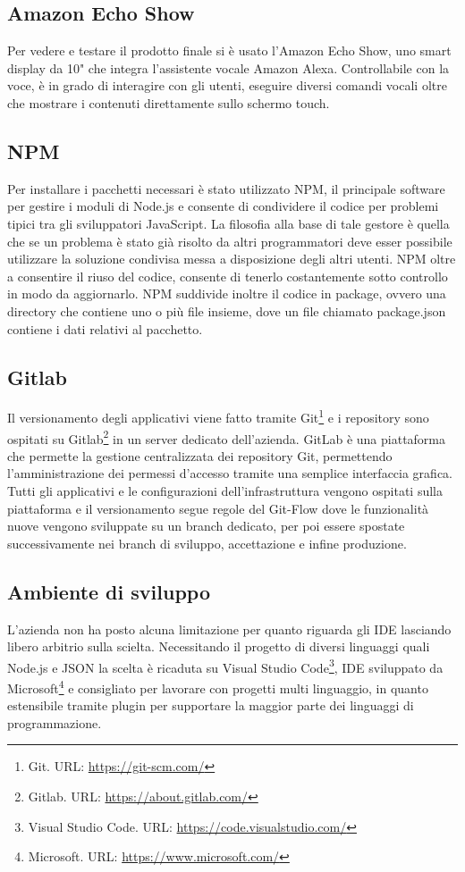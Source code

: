 \subsection{Amazon Echo Show}
Per vedere e testare il prodotto finale si è usato l'Amazon Echo Show, uno smart display da 10" che integra l’assistente vocale Amazon Alexa. Controllabile con la voce, è in grado di interagire con gli utenti, eseguire diversi comandi vocali oltre che mostrare i contenuti direttamente sullo schermo touch.

\subsection{NPM}
Per installare i pacchetti necessari è stato utilizzato NPM, il principale software per gestire i moduli di Node.js e consente di condividere il codice per problemi tipici tra gli sviluppatori JavaScript. La filosofia alla base di tale gestore è quella che se un problema è stato già risolto da altri programmatori deve esser possibile utilizzare la soluzione condivisa messa a disposizione degli altri utenti. NPM oltre a consentire il riuso del codice, consente di tenerlo costantemente sotto controllo in modo da aggiornarlo. NPM suddivide inoltre il codice in package, ovvero una directory che contiene uno o più file insieme, dove un file chiamato package.json contiene i dati relativi al pacchetto.

\subsection{Gitlab}
Il versionamento degli applicativi viene fatto tramite Git\footnote{Git. URL: \href{https://git-scm.com/}{https://git-scm.com/}} e i repository sono ospitati su Gitlab\footnote{Gitlab. URL: \href{https://about.gitlab.com/}{https://about.gitlab.com/}} in un server dedicato dell'azienda. GitLab è una piattaforma che permette la gestione centralizzata dei repository Git, permettendo l'amministrazione dei permessi d'accesso tramite una semplice interfaccia grafica. Tutti gli applicativi e le configurazioni dell'infrastruttura vengono ospitati sulla piattaforma e il versionamento segue regole del Git-Flow dove le funzionalità nuove vengono sviluppate su un branch dedicato, per poi essere spostate successivamente nei branch di sviluppo, accettazione e infine produzione.

\subsection{Ambiente di sviluppo}
L’azienda non ha posto alcuna limitazione per quanto riguarda gli IDE lasciando libero arbitrio sulla scielta. Necessitando il progetto di diversi linguaggi quali Node.js e JSON la scelta è ricaduta su Visual Studio Code\footnote{Visual Studio Code. URL: \href{https://code.visualstudio.com/}{https://code.visualstudio.com/}}, IDE sviluppato da Microsoft\footnote{Microsoft. URL: \href{https://www.microsoft.com/}{https://www.microsoft.com/}} e consigliato per lavorare con progetti multi linguaggio, in quanto estensibile tramite plugin per supportare la maggior parte dei linguaggi di programmazione.
